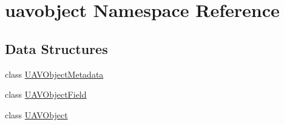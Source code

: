 \hypertarget{namespaceuavobject}{\section{uavobject \-Namespace \-Reference}
\label{namespaceuavobject}
}
\subsection*{\-Data \-Structures}
\begin{DoxyCompactItemize}
\item 
class \hyperlink{classuavobject_1_1_u_a_v_object_metadata}{\-U\-A\-V\-Object\-Metadata}
\item 
class \hyperlink{classuavobject_1_1_u_a_v_object_field}{\-U\-A\-V\-Object\-Field}
\item 
class \hyperlink{classuavobject_1_1_u_a_v_object}{\-U\-A\-V\-Object}
\end{DoxyCompactItemize}

